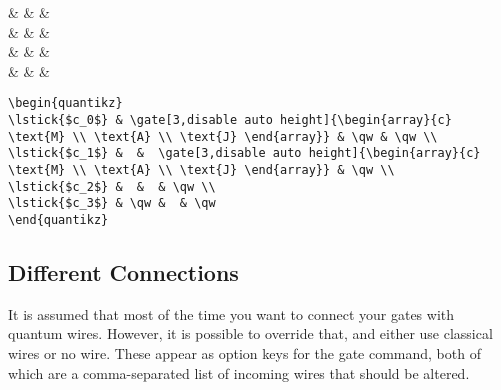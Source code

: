 \documentclass[aps,pra,10pt,nofootinbib]{revtex4}
\begin{document}
\begin{Code}
\begin{center}
\begin{quantikz}
 &  & \qw & \qw \\
 &  &   & \qw \\
 &  &  & \qw \\
 & \qw &  & \qw
\end{quantikz}
\end{center}
\tcblower
\begin{lstlisting}
\begin{quantikz}
\lstick{$c_0$} & \gate[3,disable auto height]{\begin{array}{c} \text{M} \\ \text{A} \\ \text{J} \end{array}} & \qw & \qw \\
\lstick{$c_1$} &  &  \gate[3,disable auto height]{\begin{array}{c} \text{M} \\ \text{A} \\ \text{J} \end{array}} & \qw \\
\lstick{$c_2$} &  &  & \qw \\
\lstick{$c_3$} & \qw &  & \qw
\end{quantikz}
\end{lstlisting}
\end{Code}

\subsection{Different Connections}

It is assumed that most of the time you want to connect your gates with quantum wires. However, it is possible to override that, and either use classical wires or no wire. These appear as option keys for the gate command, both of which are a comma-separated list of incoming wires that should be altered.
\end{document}
